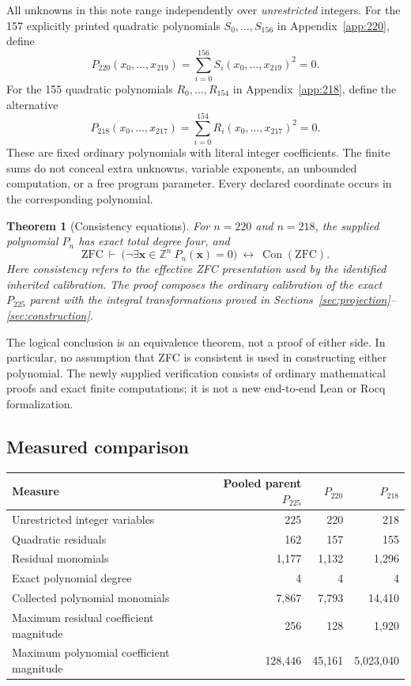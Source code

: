 \documentclass[10pt,letterpaper]{article}
\newtheorem{theorem}{Theorem}[section]
\theoremstyle{definition}\newtheorem{definition}[theorem]{Definition}
\newcommand{\Z}{\mathbb Z}\newcommand{\Q}{\mathbb Q}
\newcommand{\Con}{\operatorname{Con}}
\begin{document}
All unknowns in this note range independently over \emph{unrestricted}
integers. For the 157 explicitly printed quadratic polynomials
$S_0,\ldots,S_{156}$ in Appendix~\ref{app:220}, define
\begin{equation}\label{eq:p220}
\boxed{\displaystyle P_{220}(x_0,\ldots,x_{219})
       =\sum_{i=0}^{156}S_i(x_0,\ldots,x_{219})^2=0.}
\end{equation}
For the 155 quadratic polynomials $R_0,\ldots,R_{154}$ in
Appendix~\ref{app:218}, define the alternative
\begin{equation}\label{eq:p218}
\boxed{\displaystyle P_{218}(x_0,\ldots,x_{217})
       =\sum_{i=0}^{154}R_i(x_0,\ldots,x_{217})^2=0.}
\end{equation}
These are fixed ordinary polynomials with literal integer coefficients.
The finite sums do not conceal extra unknowns, variable exponents, an
unbounded computation, or a free program parameter. Every declared
coordinate occurs in the corresponding polynomial.

\begin{theorem}[Consistency equations]\label{thm:consistency}
For $n=220$ and $n=218$, the supplied polynomial $P_n$ has exact total
degree four, and
\[
\mathrm{ZFC}\ \vdash\
\bigl(\neg\exists\mathbf x\in\Z^n\ P_n(\mathbf x)=0\bigr)
\ \longleftrightarrow\ \Con(\mathrm{ZFC}).
\]
Here consistency refers to the effective ZFC presentation used by the
identified inherited calibration. The proof composes the ordinary
calibration of the exact $P_{225}$ parent with the integral transformations
proved in Sections~\ref{sec:projection}--\ref{sec:construction}.
\end{theorem}

The logical conclusion is an equivalence theorem, not a proof of either
side. In particular, no assumption that ZFC is consistent is used in
constructing either polynomial. The newly supplied verification consists
of ordinary mathematical proofs and exact finite computations; it is not
a new end-to-end Lean or Rocq formalization.

\subsection{Measured comparison}
\begin{center}\small
\begin{tabular}{lrrr}
\toprule
Measure & Pooled parent $P_{225}$ & $P_{220}$ & $P_{218}$\\
\midrule
Unrestricted integer variables &225&220&218\\
Quadratic residuals &162&157&155\\
Residual monomials &1,177&1,132&1,296\\
Exact polynomial degree &4&4&4\\
Collected polynomial monomials &7,867&7,793&14,410\\
Maximum residual coefficient magnitude &256&128&1,920\\
Maximum polynomial coefficient magnitude &128,446&45,161&5,023,040\\
\bottomrule
\end{tabular}
\end{center}
\end{document}
